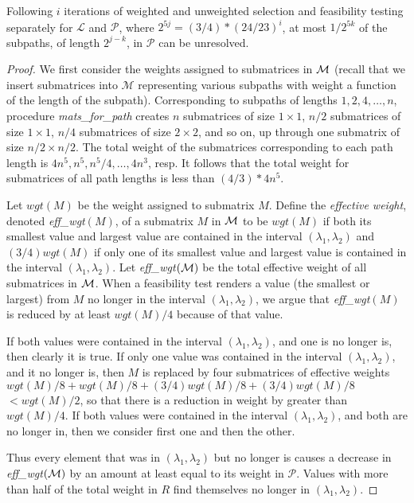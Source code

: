 \documentclass[12pt]{article}
\begin{document}
\begin{spacing}{1.5}
\begin{lemma}
Following $i$ iterations of weighted and unweighted selection and feasibility testing separately for $\mathcal{L}$ and $\mathcal{P}$, where $2^{5j}=(3/4)*(24/23)^i$, at most $1/2^{5k}$ of the subpaths, of length $2^{j-k}$, in $\mathcal{P}$ can be unresolved.
\end{lemma}

\begin{proof}
We first consider the weights assigned to submatrices in $\cal M$ 
(recall that we insert submatrices into $\mathcal{M}$ representing various subpaths 
with weight a function of the length of the subpath).
Corresponding to subpaths of lengths $1, 2, 4, \ldots , n$,
procedure {\it mats\_for\_path} creates
$n$ submatrices of size $1 \times 1$,
$n/2$ submatrices of size $1 \times 1$,
$n/4$ submatrices of size $2 \times 2$, and so on,
up through one submatrix of size $n/2 \times n/2$.
The total weight of the submatrices corresponding to each path length is
$4n^5, n^5, n^5/4, \ldots , 4n^3$, resp.
It follows that the total weight for submatrices of all path lengths is
less than $(4/3)*4n^5$.

Let $wgt(M)$ be the weight assigned to submatrix $M$.
Define the {\it effective weight},
denoted {\it eff\_wgt}$(M)$, of a submatrix $M$ in $\cal M$
to be $wgt(M)$ if both its smallest value and largest value
are contained in the interval $(\lambda_1, \lambda_2)$
and $(3/4)wgt(M)$ if only one of its smallest value and largest value
is contained in the interval $(\lambda_1, \lambda_2)$.
Let {\it eff\_wgt}$(\cal M )$ be the total effective weight of all submatrices in $\cal M$.
When a feasibility test renders a value (the smallest or largest)
from $M$ no longer in the interval $(\lambda_1, \lambda_2)$,
we argue that {\it eff\_wgt}$(M)$ is reduced by at least $wgt(M)/4$
because of that value.

If both values were contained in the interval $(\lambda_1, \lambda_2)$,
and one is no longer is, then clearly it is true.
If only one value was contained in the interval $(\lambda_1, \lambda_2)$,
and it no longer is,
then $M$ is replaced by four submatrices of effective weights
$wgt(M)/8 + wgt(M)/8 + (3/4)wgt(M)/8 + (3/4)wgt(M)/8$ $< wgt(M)/2$,
so that there is a reduction in weight by greater than $wgt(M)/4$.
If both values were contained in the interval $(\lambda_1, \lambda_2)$,
and both are no longer in,
then we consider first one and then the other.

Thus every element that was in $(\lambda_1, \lambda_2)$ but no longer is
causes a decrease in {\it eff\_wgt}$(\cal M )$ by an amount
at least equal to its weight in $\mathcal{P}$.
Values with more than half of the total weight in $R$
find themselves no longer in $(\lambda_1, \lambda_2)$.


\end{proof}
\end{spacing}
\end{document}
